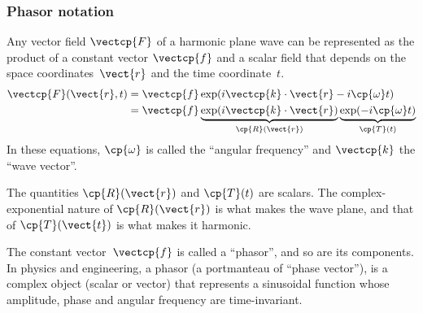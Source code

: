 \begin{refsection}
\subsubsection{Phasor notation}
\label{sec:phasor_notation}
Any vector field $\vectcp{F}$ of a harmonic plane wave can be represented as the product of a constant vector $\vectcp{f}$ and a scalar field that depends on the space coordinates~$\vect{r}$ and the time coordinate~$t$.
\begin{subequations}
    \label{eq:harmonic_plane_field}
    \begin{align}
        \vectcp{F}(\vect{r}, t)
        &= \vectcp{f} \exp(i \vectcp{k} \cdot \vect{r} - i \cp{\omega} t)
        \\
        &= \vectcp{f}
        \underbrace{\exp(i \vectcp{k} \cdot \vect{r})}_{\cp{R}(\vect{r})}
        \underbrace{\exp(- i \cp{\omega} t)}_{\cp{T}(t)}
    \end{align}
\end{subequations}
In these equations, $\cp{\omega}$ is called the ``angular frequency''
and $\vectcp{k}$ the ``wave vector''.

The quantities $\cp{R}(\vect{r})$ and $\cp{T}(t)$ are scalars.
The complex-exponential nature of $\cp{R}(\vect{r})$ is what makes the wave plane,
and that of $\cp{T}(\vect{t})$ is what makes it harmonic.

The constant vector~$\vectcp{f}$ is called a ``phasor'', and so are its components.
In physics and engineering, a phasor (a portmanteau of ``phase vector''),
is a complex object (scalar or vector) that represents a sinusoidal function whose amplitude, phase and angular frequency are time-invariant.


\end{refsection}

